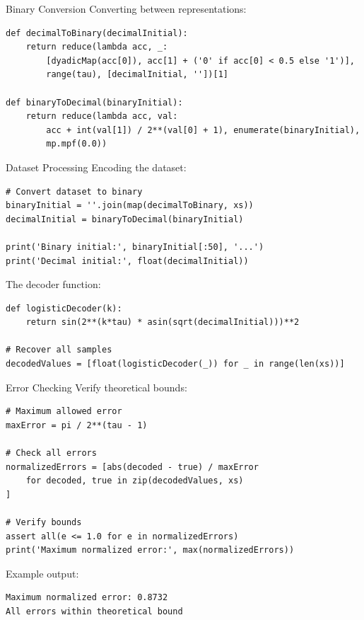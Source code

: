 \documentclass[10pt]{beamer}
\begin{document}
\begin{frame}[fragile]{Binary Conversion}
Converting between representations:
\begin{lstlisting}
def decimalToBinary(decimalInitial):
    return reduce(lambda acc, _: 
        [dyadicMap(acc[0]), acc[1] + ('0' if acc[0] < 0.5 else '1')],
        range(tau), [decimalInitial, ''])[1]

def binaryToDecimal(binaryInitial):
    return reduce(lambda acc, val: 
        acc + int(val[1]) / 2**(val[0] + 1), enumerate(binaryInitial),
        mp.mpf(0.0))
\end{lstlisting}
\end{frame}

\begin{frame}[fragile]{Dataset Processing}
Encoding the dataset:
\begin{lstlisting}
# Convert dataset to binary
binaryInitial = ''.join(map(decimalToBinary, xs))
decimalInitial = binaryToDecimal(binaryInitial)

print('Binary initial:', binaryInitial[:50], '...')
print('Decimal initial:', float(decimalInitial))
\end{lstlisting}

The decoder function:
\begin{lstlisting}
def logisticDecoder(k):
    return sin(2**(k*tau) * asin(sqrt(decimalInitial)))**2

# Recover all samples
decodedValues = [float(logisticDecoder(_)) for _ in range(len(xs))]
\end{lstlisting}
\end{frame}

\begin{frame}[fragile]{Error Checking}
Verify theoretical bounds:
\begin{lstlisting}
# Maximum allowed error
maxError = pi / 2**(tau - 1)

# Check all errors
normalizedErrors = [abs(decoded - true) / maxError 
    for decoded, true in zip(decodedValues, xs)
]

# Verify bounds
assert all(e <= 1.0 for e in normalizedErrors)
print('Maximum normalized error:', max(normalizedErrors))
\end{lstlisting}

Example output:
\begin{lstlisting}[language={}]
Maximum normalized error: 0.8732
All errors within theoretical bound
\end{lstlisting}
\end{frame}
\end{document}
